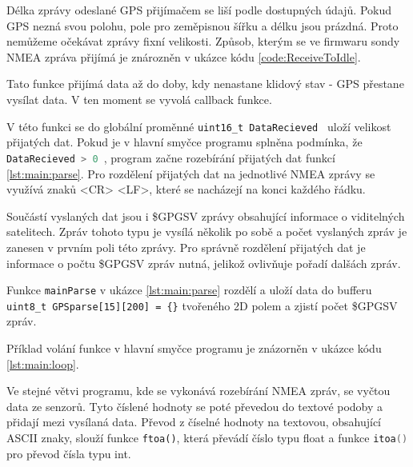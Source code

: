 \documentclass[twoside]{ctuthesis}
\theoremstyle{plain}
\theoremstyle{definition}
\theoremstyle{note}
\begin{document}
	Délka zprávy odeslané GPS přijímačem se liší podle dostupných údajů. Pokud GPS nezná svou polohu, pole pro zeměpisnou šířku a délku jsou prázdná. Proto nemůžeme očekávat zprávy fixní velikosti. Způsob, kterým se ve firmwaru sondy NMEA zpráva přijímá je znározněn v ukázce kódu \ref{code:ReceiveToIdle}.
	

	Tato funkce přijímá data až do doby, kdy nenastane klidový stav - GPS přestane vysílat data. V ten moment se vyvolá callback funkce.
	
	V této funkci se do globální proměnné \lstinline[language=C] |uint16_t DataRecieved | uloží velikost přijatých dat. Pokud je v hlavní smyčce programu splněna podmínka, že \lstinline[language=C] |  DataRecieved > 0 |, program začne rozebírání přijatých dat funkcí \ref{lst:main:parse}. Pro rozdělení přijatých dat na jednotlivé NMEA zprávy se využívá znaků <CR> <LF>, které se nacházejí na konci každého řádku. 
	
	Součástí vyslaných dat jsou i \$GPGSV zprávy obsahující informace o viditelných satelitech. Zpráv tohoto typu je vysílá několik po sobě a počet vyslaných zpráv je zanesen v prvním poli této zprávy. Pro správně rozdělení přijatých dat je informace o počtu \$GPGSV zpráv nutná, jelikož ovlivňuje pořadí dalšách zpráv.

	Funkce \lstinline[language=C] |mainParse| v ukázce \ref{lst:main:parse} rozdělí a uloží data do bufferu \lstinline |uint8_t GPSparse[15][200] = {}|   tvořeného 2D polem a zjistí počet \$GPGSV zpráv.

	



	Příklad volání funkce v hlavní smyčce programu je znázorněn v ukázce kódu \ref{lst:main:loop}.
	

	Ve stejné větvi programu, kde se vykonává rozebírání NMEA zpráv, se vyčtou data ze senzorů. Tyto číslené hodnoty se poté převedou do textové podoby a přidají mezi vysílaná data. Převod z číselné hodnoty na textovou, obsahující ASCII znaky, slouží funkce \lstinline |ftoa()|, která převádí číslo typu float a funkce \lstinline[language=C] |itoa()| pro převod čísla typu int. 
\end{document}
